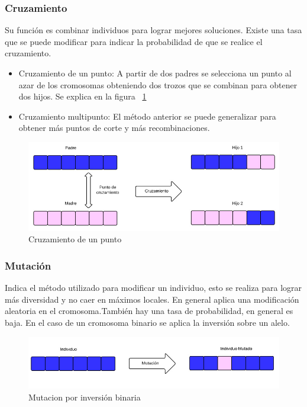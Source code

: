 \subsubsection{Cruzamiento}
Su función es combinar individuos para lograr mejores soluciones. 
Existe una tasa que se puede modificar para indicar la probabilidad de que se realice el cruzamiento.

\begin{itemize}
	\item Cruzamiento de un punto: A partir de dos padres se selecciona un punto al azar de los cromosomas obteniendo dos trozos que se combinan para obtener dos hijos. Se explica en la figura ~\ref{fig:cruzamiento1}
	\item Cruzamiento multipunto: El método anterior se puede generalizar para obtener más puntos de corte y más recombinaciones.
\end{itemize}

\begin{figure}[h]
\centering
\includegraphics[width=\textwidth]{Figures/cruzamiento1}
\caption{Cruzamiento de un punto}
\label{fig:cruzamiento1}
\end{figure}

\subsubsection{Mutación} 
Indica el método utilizado para modificar un individuo, esto se realiza para lograr más diversidad y no caer en máximos locales. En general aplica una modificación aleatoria en el cromosoma.También hay una tasa de probabilidad, en general es baja. En el caso de un cromosoma binario se aplica la inversión sobre un alelo.

\begin{figure}[h]
\centering
\includegraphics[width=1\linewidth]{Figures/mutacion1}
\caption{Mutacion por inversión binaria}
\label{fig:mutacion1}
\end{figure}



